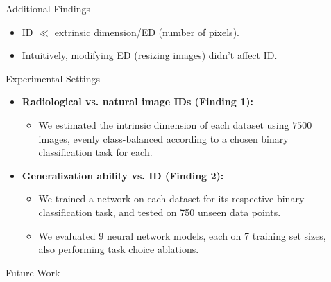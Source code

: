 \documentclass[final,hyperref={pdfpagelabels=false}]{beamer}
\begin{document}
\begin{frame}[t]
\begin{columns}[t]
\begin{column}{.3\textwidth}
\end{column} %

\begin{column}{.03\textwidth}\end{column} %
 
\begin{column}{.3\textwidth} %



\begin{block}{Additional Findings}
    \begin{itemize}
        \item ID $\ll$ extrinsic dimension/ED (number of pixels).
        \item Intuitively, modifying ED (resizing images) didn't affect ID.
    \end{itemize}
\end{block}
\begin{block}{Experimental Settings}
    \begin{itemize}
        \item \textbf{Radiological vs. natural image IDs (Finding 1):}
        \begin{itemize}
            \item We estimated the intrinsic dimension of each dataset using $7500$ images, evenly class-balanced according to a chosen binary classification task for each.
        \end{itemize}

        \item \textbf{Generalization ability vs. ID (Finding 2):}
        \begin{itemize}
        \item We trained a network on each dataset for its respective binary classification task, and tested on 750 unseen data points.
        \item We evaluated 9 neural network models, each on 7 training set sizes, also performing task choice ablations.
        \end{itemize}
    \end{itemize}

\end{block}

\begin{block}{Future Work}


\end{block}
\end{column}
\end{columns}
\end{frame}
\end{document}
